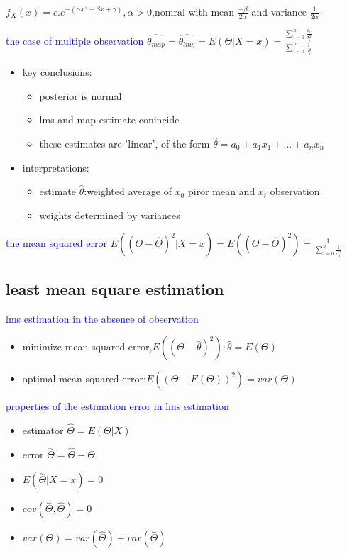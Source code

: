 $f_X(x)=c.e^{-(\alpha x^2+\beta x+\gamma)},\alpha>0$,nomral with mean $\frac{-\beta}{2\alpha}$ and variance $\frac{1}{2\alpha}$

\textcolor{blue}{the case of multiple observation}
$\hat{\theta_{map}}=\hat{\theta_{lms}}=E(\Theta|X=x)=\frac{\sum_{i=0}^{n}\frac{x_i}{\sigma_i^2}}{\sum_{i=0}^{n}\frac{1}{\sigma_i^2}}$

\begin{itemize}
    \item key conclusions:
    \begin{itemize}
        \item posterior is normal
        \item lms and map estimate conincide
        \item these estimates are 'linear', of the form $\hat{\theta}=a_0+a_1x_1+...+a_nx_n$ 
    \end{itemize}
    \item interpretations:
    \begin{itemize}
        \item estimate $\hat{\theta}$:weighted average of $x_0$ piror mean and $x_i$ observation
        \item weights determined by variances
    \end{itemize}
\end{itemize}

\textcolor{blue}{the mean squared error}
$E((\Theta-\hat{\Theta})^2|X=x)=E((\Theta-\hat{\Theta})^2)=\frac{1}{\sum_{i=0}^{n}\frac{1}{\sigma_i^2}}$






\subsection*{least mean square estimation}


\textcolor{blue}{lms estimation in the absence of observation}

\begin{itemize}
    \item minimize mean squared error,$E((\Theta-\hat{\theta})^2):\hat{\theta}=E(\Theta)$
    \item optimal mean squared error:$E((\Theta-E(\Theta))^2)=var(\Theta)$
\end{itemize}


\textcolor{blue}{properties of the estimation error in lms estimation}

\begin{itemize}
    \item estimator $\hat{\Theta}=E(\Theta|X)$
    \item error $\overset{\sim}{\Theta}=\hat{\Theta}-\Theta$
    \item $E(\overset{\sim}{\Theta}|X=x)=0$
    \item $cov(\overset{\sim}{\Theta},\hat{\Theta})=0$
    \item $var(\Theta)=var(\hat{\Theta})+var(\overset{\sim}{\Theta})$ 
\end{itemize}